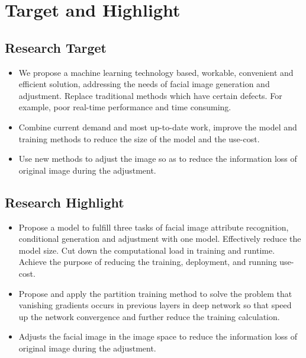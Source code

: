 \section{Target and Highlight}

\subsection{Research Target}
\begin{itemize}
\item We propose a machine learning technology based, workable, convenient and efficient solution,
    addressing the needs of facial image generation and adjustment.
    Replace traditional methods which have certain defects. For example, poor real-time performance and time consuming.
\item Combine current demand and most up-to-date work, 
    improve the model and training methods to reduce the size of the model and the use-cost.
\item Use new methods to adjust the image so as to reduce the information loss of original image during the adjustment.
\end{itemize}
\subsection{Research Highlight}
\begin{itemize}
\item Propose a model to fulfill three tasks of facial image attribute recognition,
    conditional generation and adjustment with one model.
    Effectively reduce the model size. Cut down the computational load in training and runtime.
    Achieve the purpose of reducing the training, deployment, and running use-cost.
\item Propose and apply the partition training method to solve the problem that vanishing gradients occurs in previous layers in deep network so that speed up the network convergence and further reduce the training calculation.

\item Adjusts the facial image in the image space to reduce the information loss of original image during the adjustment.
\end{itemize}